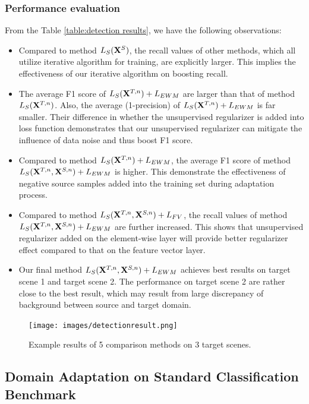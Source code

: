 \documentclass[runningheads]{llncs}
\begin{document}
\subsubsection{Performance evaluation}
From the Table \ref{table:detection results}, we have the following observations:
\begin{itemize}
    \item Compared to method $L_{S}({\bf X}^{S})$, the recall values of other methods, which all utilize iterative algorithm for training, are explicitly larger. This implies the effectiveness of our iterative algorithm on boosting recall.
    \item The average F1 score of $L_{S}({\bf X}^{T,n})+L_{EWM}$ are larger than that of method $L_{S}({\bf X}^{T,n})$. Also, the average (1-precision) of $L_{S}({\bf X}^{T,n})+L_{EWM}$ is far smaller. Their difference in whether the unsupervised regularizer is added into loss function demonstrates that our unsupervised regularizer can mitigate the influence of data noise and thus boost F1 score.
    \item Compared to method $L_{S}({\bf X}^{T,n})+L_{EWM}$, the average F1 score of method $L_{S}({\bf X}^{T,n},{\bf X}^{S,n})+L_{EWM}$ is higher. This demonstrate the effectiveness of negative source samples added into the training set during adaptation process.
    \item Compared to method $L_{S}({\bf X}^{T,n},{\bf X}^{S,n})+L_{FV}$, the recall values of method $L_{S}({\bf X}^{T,n},{\bf X}^{S,n})+L_{EWM}$ are further increased. This shows that unsupervised regularizer added on the element-wise layer will provide better regularizer effect compared to that on the feature vector layer.
    \item Our final method $L_{S}({\bf X}^{T,n},{\bf X}^{S,n})+L_{EWM}$ achieves best results on target scene 1 and target scene 2. The performance on target scene 2 are rather close to the best result, which may result from large discrepancy of background between source and target domain.
\end{itemize}

\begin{figure}
\centering
\texttt{[image: images/detectionresult.png]}
\caption{Example results of 5 comparison methods on 3 target scenes.}
\label{fig:detectionresult}
\end{figure}


\subsection{Domain Adaptation on Standard Classification Benchmark}
\end{document}

